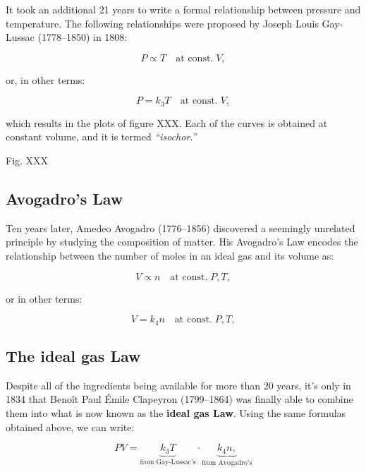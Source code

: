 \documentclass[
  9pt,
]{extbook}
\theoremstyle{definition}
\theoremstyle{definition}
\theoremstyle{definition}
\theoremstyle{remark}
\begin{document}
It took an additional 21 years to write a formal relationship between pressure and temperature. The following relationships were proposed by Joseph Louis Gay-Lussac (1778--1850) in 1808:

\begin{equation}
P\propto T\quad\text{at const.}\;V,
\label{eq:gaylussac1}
\end{equation}

or, in other terms:

\begin{equation}
P=k_3 T\quad\text{at const.}\;V,
\label{eq:gaylussac2}
\end{equation}

which results in the plots of figure XXX. Each of the curves is obtained at constant volume, and it is termed \emph{``isochor.''}

Fig. XXX

\hypertarget{avogadros-law}{%
\subsection{Avogadro's Law}\label{avogadros-law}}

Ten years later, Amedeo Avogadro (1776--1856) discovered a seemingly unrelated principle by studying the composition of matter. His Avogadro's Law encodes the relationship between the number of moles in an ideal gas and its volume as:

\begin{equation}
V\propto n\quad\text{at const.}\;P,T,
\label{eq:avogadrolaw1}
\end{equation}

or in other terms:

\begin{equation}
V=k_4 n\quad\text{at const.}\;P,T,
\label{eq:avogadrolaw2}
\end{equation}

\hypertarget{the-ideal-gas-law}{%
\subsection{The ideal gas Law}\label{the-ideal-gas-law}}

Despite all of the ingredients being available for more than 20 years, it's only in 1834 that Benoît Paul Émile Clapeyron (1799--1864) was finally able to combine them into what is now known as the \textbf{ideal gas Law}. Using the same formulas obtained above, we can write:

\begin{equation}
PV=\underbrace{k_3 T}_{\text{from Gay-Lussac's}} \cdot \underbrace{k_4 n,}_{\text{from Avogadro's}}
\label{eq:ideallaw1}
\end{equation}
\end{document}
